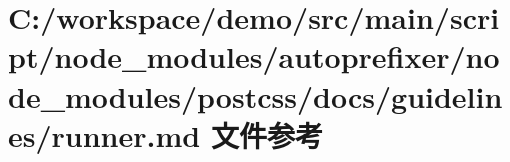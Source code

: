 \hypertarget{autoprefixer_2node__modules_2postcss_2docs_2guidelines_2runner_8md}{}\section{C\+:/workspace/demo/src/main/script/node\+\_\+modules/autoprefixer/node\+\_\+modules/postcss/docs/guidelines/runner.md 文件参考}
\label{autoprefixer_2node__modules_2postcss_2docs_2guidelines_2runner_8md}
